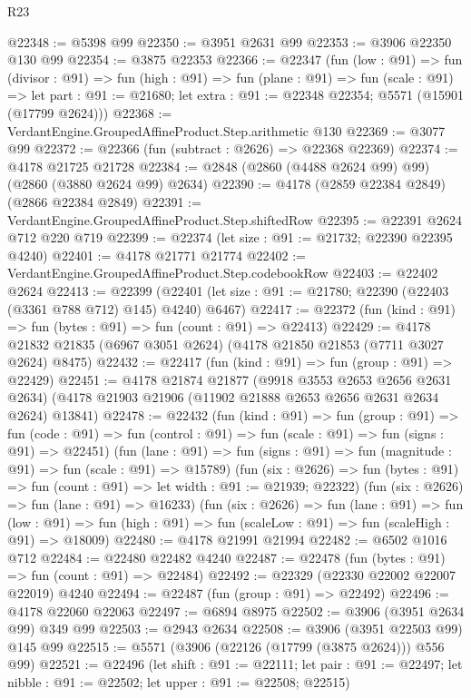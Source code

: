 \begin{lexlean}{R23}
\begin{coremodule}
@22348 := @5398 @99
@22350 := @3951 @2631 @99
@22353 := @3906 @22350 @130 @99
@22354 := @3875 @22353
@22366 := @22347
    (fun (low : @91) =>
    fun (divisor : @91) =>
    fun (high : @91) =>
    fun (plane : @91) =>
    fun (scale : @91) =>
    let part : @91 := @21680; let extra : @91 := @22348 @22354; @5571 (@15901 (@17799 @2624)))
@22368 := VerdantEngine.GroupedAffineProduct.Step.arithmetic @130
@22369 := @3077 @99
@22372 := @22366 (fun (subtract : @2626) => @22368 @22369)
@22374 := @4178 @21725 @21728
@22384 := @2848 (@2860 (@4488 @2624 @99) @99) (@2860 (@3880 @2624 @99) @2634)
@22390 := @4178 (@2859 @22384 @2849) (@2866 @22384 @2849)
@22391 := VerdantEngine.GroupedAffineProduct.Step.shiftedRow
@22395 := @22391 @2624 @712 @220 @719
@22399 := @22374 (let size : @91 := @21732; @22390 @22395 @4240)
@22401 := @4178 @21771 @21774
@22402 := VerdantEngine.GroupedAffineProduct.Step.codebookRow
@22403 := @22402 @2624
@22413 := @22399
    (@22401 (let size : @91 := @21780; @22390 (@22403 (@3361 @788 @712) @145) @4240) @6467)
@22417 := @22372 (fun (kind : @91) => fun (bytes : @91) => fun (count : @91) => @22413)
@22429 := @4178 @21832 @21835 (@6967 @3051 @2624) (@4178 @21850 @21853 (@7711 @3027 @2624) @8475)
@22432 := @22417 (fun (kind : @91) => fun (group : @91) => @22429)
@22451 := @4178
    @21874
    @21877
    (@9918 @3553 @2653 @2656 @2631 @2634)
    (@4178 @21903 @21906 (@11902 @21888 @2653 @2656 @2631 @2634 @2624) @13841)
@22478 := @22432
    (fun (kind : @91) =>
    fun (group : @91) =>
    fun (code : @91) => fun (control : @91) => fun (scale : @91) => fun (signs : @91) => @22451)
    (fun (lane : @91) => fun (signs : @91) => fun (magnitude : @91) => fun (scale : @91) => @15789)
    (fun (six : @2626) =>
    fun (bytes : @91) => fun (count : @91) => let width : @91 := @21939; @22322)
    (fun (six : @2626) => fun (lane : @91) => @16233)
    (fun (six : @2626) =>
    fun (lane : @91) =>
    fun (low : @91) => fun (high : @91) => fun (scaleLow : @91) => fun (scaleHigh : @91) => @18009)
@22480 := @4178 @21991 @21994
@22482 := @6502 @1016 @712
@22484 := @22480 @22482 @4240
@22487 := @22478 (fun (bytes : @91) => fun (count : @91) => @22484)
@22492 := @22329 (@22330 @22002 @22007 @22019) @4240
@22494 := @22487 (fun (group : @91) => @22492)
@22496 := @4178 @22060 @22063
@22497 := @6894 @8975
@22502 := @3906 (@3951 @2634 @99) @349 @99
@22503 := @2943 @2634
@22508 := @3906 (@3951 @22503 @99) @145 @99
@22515 := @5571 (@3906 (@22126 (@17799 (@3875 @2624))) @556 @99)
@22521 := @22496
    (let shift : @91 := @22111;
    let pair : @91 := @22497; let nibble : @91 := @22502; let upper : @91 := @22508; @22515)

\end{coremodule}
\end{lexlean}
